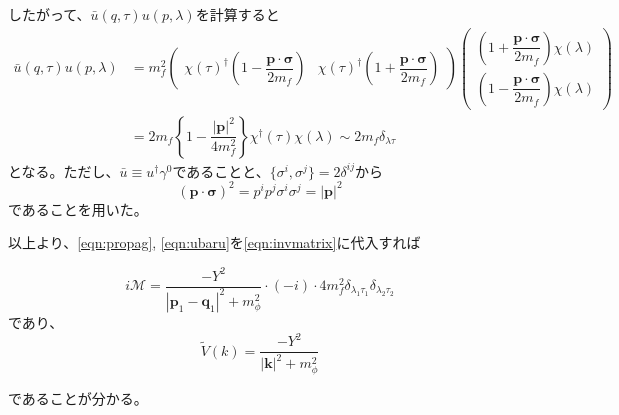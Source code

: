 \documentclass[unicode,a4paper,10pt]{ltjsarticle}
\begin{document}
\begin{enumerate}
        したがって、$\bar{u}(q,\tau)u(p,\lambda)$を計算すると
        \begin{align}
          \bar{u}(q,\tau)u(p,\lambda)
           & =
          m_{f}^2
          \begin{pmatrix}
            \chi(\tau)^{\dag}\left( 1-\dfrac{\bm{p}\cdot\bm{\sigma}}{2m_{f}} \right) &
            \chi(\tau)^{\dag}\left( 1+\dfrac{\bm{p}\cdot\bm{\sigma}}{2m_{f}} \right)
          \end{pmatrix}
          \begin{pmatrix}
            \left( 1+\dfrac{\bm{p}\cdot\bm{\sigma}}{2m_{f}} \right)\chi(\lambda) \\
            \left( 1-\dfrac{\bm{p}\cdot\bm{\sigma}}{2m_{f}} \right)\chi(\lambda)
          \end{pmatrix}
          \nonumber
          \\
           & =
          2m_{f}
          \left\{
          1-\dfrac{|\bm{p}|^2}{4m_{f}^2}
          \right\}
          \chi^{\dag}(\tau)\chi(\lambda)
          \sim
          2m_{f}\delta_{\lambda\tau}
          \label{eqn:ubaru}
        \end{align}
        となる。ただし、$\bar{u}\equiv u^{\dag}\gamma^{0}$であることと、$\{ \sigma^{i},\sigma^{j} \}=2\delta^{ij}$から
        \begin{equation}
          (\bm{p}\cdot\bm{\sigma})^2
          =
          p^{i}p^{j}\sigma^{i}\sigma^{j}
          =
          |\bm{p}|^2
        \end{equation}
        であることを用いた。

        以上より、\eqref{eqn:propag}, \eqref{eqn:ubaru}を\eqref{eqn:invmatrix}に代入すれば
        \begin{graybox}
          \begin{equation}
            i\mathcal{M}
            =
            \dfrac{-Y^2}{|\bm{p}_{1}-\bm{q}_{1}|^2+m_{\phi}^2}
            \cdot
            (-i)
            \cdot
            4m_{f}^2\delta_{\lambda_{1}\tau_{1}}\delta_{\lambda_{2}\tau_{2}}
          \end{equation}
          であり、
          \begin{equation}
            \tilde{V}(k)
            =
            \dfrac{-Y^2}{|\bm{k}|^2+m_{\phi}^2}
          \end{equation}
        \end{graybox}
        であることが分かる。



\end{enumerate}
\end{document}
